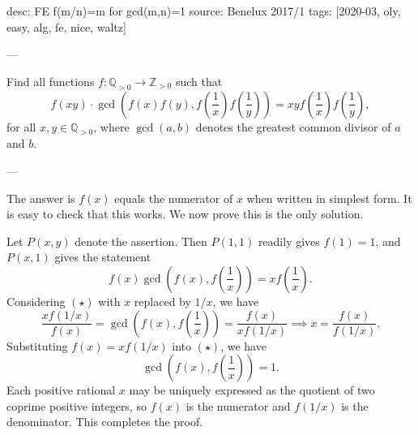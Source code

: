 desc: FE f(m/n)=m for gcd(m,n)=1
source: Benelux 2017/1
tags: [2020-03, oly, easy, alg, fe, nice, waltz]

---

Find all functions $f:\mathbb Q_{>0}\to\mathbb Z_{>0}$ such that \[f(xy)\cdot \gcd\left(f(x)f(y),f\left(\frac1x\right)f\left(\frac1y\right)\right)=xyf\left(\frac1x\right)f\left(\frac1y\right),\]
for all $x,y\in\mathbb Q_{>0}$, where $\gcd(a,b)$ denotes the greatest common divisor of $a$ and $b$.

---

The answer is $f(x)$ equals the numerator of $x$ when written in simplest form. It is easy to check that this works. We now prove this is the only solution.

Let $P(x,y)$ denote the assertion. Then $P(1,1)$ readily gives $f(1)=1$, and $P(x,1)$ gives the statement \[f(x)\gcd\left(f(x),f\left(\frac1x\right)\right)=xf\left(\frac1x\right).\tag{$\star$}\]
Considering $(\star)$ with $x$ replaced by $1/x$, we have \[\frac{xf(1/x)}{f(x)}=\gcd\left(f(x),f\left(\frac1x\right)\right)=\frac{f(x)}{xf(1/x)}\implies x=\frac{f(x)}{f(1/x)}.\]
Substituting $f(x)=xf(1/x)$ into $(\star)$, we have \[\gcd\left(f(x),f\left(\frac1x\right)\right)=1.\]
Each positive rational $x$ may be uniquely expressed as the quotient of two coprime positive integers, so $f(x)$ is the numerator and $f(1/x)$ is the denominator. This completes the proof.
